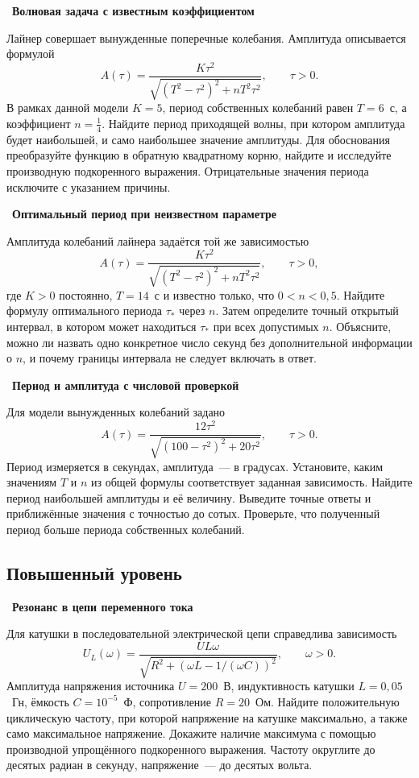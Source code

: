 \documentclass[a4paper,12pt]{article}
\newcommand{\task}[2]{\Needspace{12\baselineskip}\par\medskip\noindent{\color{darkaccent}\bfseries Задача~#1.}~\textbf{#2}\par\smallskip}
\begin{document}
\task{5}{Волновая задача с известным коэффициентом}
Лайнер совершает вынужденные поперечные колебания. Амплитуда описывается формулой
\[
A(\tau)=\frac{K\tau^2}{\sqrt{(T^2-\tau^2)^2+nT^2\tau^2}},\qquad \tau>0.
\]
В рамках данной модели $K=5$, период собственных колебаний равен $T=6$~с, а коэффициент $n=\tfrac14$. Найдите период приходящей волны, при котором амплитуда будет наибольшей, и само наибольшее значение амплитуды. Для обоснования преобразуйте функцию в обратную квадратному корню, найдите и исследуйте производную подкоренного выражения. Отрицательные значения периода исключите с указанием причины.

\task{6}{Оптимальный период при неизвестном параметре}
Амплитуда колебаний лайнера задаётся той же зависимостью
\[
A(\tau)=\frac{K\tau^2}{\sqrt{(T^2-\tau^2)^2+nT^2\tau^2}},\qquad \tau>0,
\]
где $K>0$ постоянно, $T=14$~с и известно только, что $0<n<0{,}5$. Найдите формулу оптимального периода $\tau_*$ через $n$. Затем определите точный открытый интервал, в котором может находиться $\tau_*$ при всех допустимых $n$. Объясните, можно ли назвать одно конкретное число секунд без дополнительной информации о $n$, и почему границы интервала не следует включать в ответ.

\task{7}{Период и амплитуда с числовой проверкой}
Для модели вынужденных колебаний задано
\[
A(\tau)=\frac{12\tau^2}{\sqrt{(100-\tau^2)^2+20\tau^2}},\qquad \tau>0.
\]
Период измеряется в секундах, амплитуда~--- в градусах. Установите, каким значениям $T$ и $n$ из общей формулы соответствует заданная зависимость. Найдите период наибольшей амплитуды и её величину. Выведите точные ответы и приближённые значения с точностью до сотых. Проверьте, что полученный период больше периода собственных колебаний.

\subsection*{Повышенный уровень}
\task{8}{Резонанс в цепи переменного тока}
Для катушки в последовательной электрической цепи справедлива зависимость
\[
U_L(\omega)=\frac{UL\omega}{\sqrt{R^2+(\omega L-1/(\omega C))^2}},
\qquad \omega>0.
\]
Амплитуда напряжения источника $U=200$~В, индуктивность катушки $L=0{,}05$~Гн, ёмкость $C=10^{-5}$~Ф, сопротивление $R=20$~Ом. Найдите положительную циклическую частоту, при которой напряжение на катушке максимально, а также само максимальное напряжение. Докажите наличие максимума с помощью производной упрощённого подкоренного выражения. Частоту округлите до десятых радиан в секунду, напряжение~--- до десятых вольта.
\end{document}
